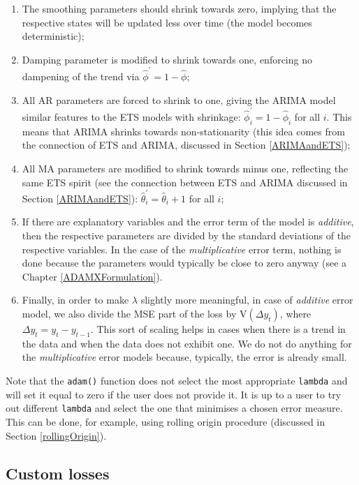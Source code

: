 \documentclass[]{book}
\providecommand{\tightlist}{%
  \setlength{\itemsep}{0pt}\setlength{\parskip}{0pt}}
\theoremstyle{definition}
\theoremstyle{definition}
\theoremstyle{definition}
\theoremstyle{definition}
\theoremstyle{remark}
\begin{document}
\begin{enumerate}
\def\labelenumi{\arabic{enumi}.}
\tightlist
\item
  The smoothing parameters should shrink towards zero, implying that the respective states will be updated less over time (the model becomes deterministic);
\item
  Damping parameter is modified to shrink towards one, enforcing no dampening of the trend via \(\hat{\phi}^\prime=1-\hat{\phi}\);
\item
  All AR parameters are forced to shrink to one, giving the ARIMA model similar features to the ETS models with shrinkage: \(\hat{\phi}_i^\prime=1-\hat{\phi}_i\) for all \(i\). This means that ARIMA shrinks towards non-stationarity (this idea comes from the connection of ETS and ARIMA, discussed in Section \ref{ARIMAandETS});
\item
  All MA parameters are modified to shrink towards minus one, reflecting the same ETS spirit (see the connection between ETS and ARIMA discussed in Section \ref{ARIMAandETS}): \(\hat{\theta}_i^\prime=\hat{\theta}_i+1\) for all \(i\);
\item
  If there are explanatory variables and the error term of the model is \emph{additive}, then the respective parameters are divided by the standard deviations of the respective variables. In the case of the \emph{multiplicative} error term, nothing is done because the parameters would typically be close to zero anyway (see a Chapter \ref{ADAMXFormulation}).
\item
  Finally, in order to make \(\lambda\) slightly more meaningful, in case of \emph{additive} error model, we also divide the MSE part of the loss by \(\mathrm{V}\left({\Delta}y_t\right)\), where \({\Delta}y_t=y_t-y_{t-1}\). This sort of scaling helps in cases when there is a trend in the data and when the data does not exhibit one. We do not do anything for the \emph{multiplicative} error models because, typically, the error is already small.
\end{enumerate}

Note that the \texttt{adam()} function does not select the most appropriate \texttt{lambda} and will set it equal to zero if the user does not provide it. It is up to a user to try out different \texttt{lambda} and select the one that minimises a chosen error measure. This can be done, for example, using rolling origin procedure (discussed in Section \ref{rollingOrigin}).

\hypertarget{custom-losses}{%
\subsection{Custom losses}\label{custom-losses}}
\end{document}
